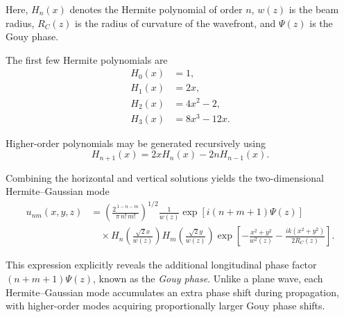 \documentclass{report}
\begin{document}
Here, $H_n(x)$ denotes the Hermite polynomial of order $n$, $w(z)$ is the beam radius, $R_C(z)$ is the radius of curvature of the wavefront, and $\Psi(z)$ is the Gouy phase.

The first few Hermite polynomials are
\begin{align}
H_0(x) &= 1, \\
H_1(x) &= 2x, \\
H_2(x) &= 4x^2-2, \\
H_3(x) &= 8x^3-12x.
\end{align}

Higher-order polynomials may be generated recursively using
\begin{equation}
H_{n+1}(x)
=
2xH_n(x)
-
2nH_{n-1}(x).
\end{equation}

Combining the horizontal and vertical solutions yields the two-dimensional Hermite--Gaussian mode
\begin{align}
u_{nm}(x,y,z)
&=
\left(
\frac{2^{\,1-n-m}}
     {\pi\,n!\,m!}
\right)^{1/2}
\frac{1}{w(z)}
\exp\!\left[i(n+m+1)\Psi(z)\right]
\nonumber\\
&\quad\times
H_n\!\left(\frac{\sqrt{2}x}{w(z)}\right)
H_m\!\left(\frac{\sqrt{2}y}{w(z)}\right)
\exp\!\left[
-\frac{x^2+y^2}{w^2(z)}
-\frac{ik(x^2+y^2)}{2R_C(z)}
\right].
\end{align}

This expression explicitly reveals the additional longitudinal phase factor $(n+m+1)\Psi(z)$, known as the \textit{Gouy phase}. Unlike a plane wave, each Hermite--Gaussian mode accumulates an extra phase shift during propagation, with higher-order modes acquiring proportionally larger Gouy phase shifts. 
\end{document}
